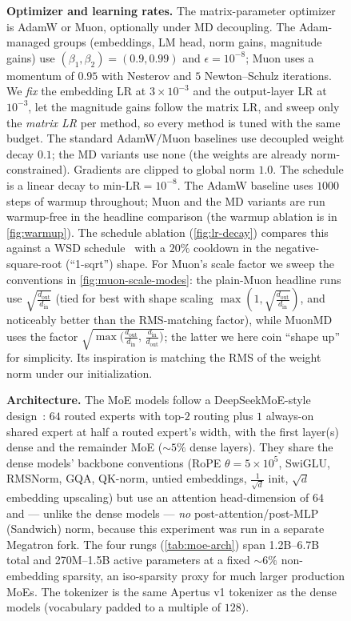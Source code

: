 \documentclass[10pt]{article} %
\makeatletter
\newcommand{\dout}{d_{\text{out}}}
\newcommand{\din}{d_{\text{in}}}
\def\subsection{\@startsection{subsection}{2}{\z@}{-1.6ex plus -0.5ex minus -.2ex}{0.5ex plus .1ex}{\normalsize\bf\raggedright\sffamily}}
\makeatother
\begin{document}
\begin{figure}[t]
\textbf{Optimizer and learning rates.} The matrix-parameter optimizer is AdamW or Muon, optionally under MD decoupling. The Adam-managed groups (embeddings, LM head, norm gains, magnitude gains) use $(\beta_1,\beta_2)=(0.9,0.99)$ and $\epsilon=10^{-8}$; Muon uses a momentum of $0.95$ with Nesterov and $5$ Newton--Schulz iterations. We \emph{fix} the embedding LR at $3\!\times\!10^{-3}$ and the output-layer LR at $10^{-3}$, let the magnitude gains follow the matrix LR, and sweep only the \emph{matrix LR} per method, so every method is tuned with the same budget. The standard AdamW/Muon baselines use decoupled weight decay $0.1$; the MD variants use none (the weights are already norm-constrained). Gradients are clipped to global norm $1.0$. The schedule is a linear decay to $\text{min-LR}=10^{-8}$. The AdamW baseline uses $1000$ steps of warmup throughout; Muon and the MD variants are run warmup-free in the headline comparison (the warmup ablation is in \autoref{fig:warmup}). The schedule ablation (\autoref{fig:lr-decay}) compares this against a WSD schedule~\citep{hu2024minicpm,hagele2024scaling,schaipp2025surprising,dremov2025training} with a $20\%$ cooldown in the negative-square-root (``1-sqrt'') shape. For Muon's scale factor we sweep the conventions in \autoref{fig:muon-scale-modes}: the plain-Muon headline runs use $\sqrt{\frac{\dout}{\din}}$ (tied for best with shape scaling $\max(1,\sqrt{\frac{\dout}{\din}})$, and noticeably better than the RMS-matching factor), while MuonMD uses the factor $\sqrt{\max\!\big(\frac{\dout}{\din},\, \frac{\din}{\dout}\big)}$; the latter we here coin ``shape up'' for simplicity. Its inspiration is matching the RMS of the weight norm under our initialization.

\subsection{Mixture-of-Experts Models}
\label{sec:appendix-setup-moe}

\textbf{Architecture.} The MoE models follow a DeepSeekMoE-style design~\citep{dai2024deepseekmoe}: $64$ routed experts with top-$2$ routing plus $1$ always-on shared expert at half a routed expert's width, with the first layer(s) dense and the remainder MoE ($\sim$$5\%$ dense layers). They share the dense models' backbone conventions (RoPE $\theta=5\!\times\!10^5$, SwiGLU, RMSNorm, GQA, QK-norm, untied embeddings, $\frac{1}{\sqrt{d}}$ init, $\sqrt{d}$ embedding upscaling) but use an attention head-dimension of $64$ and --- unlike the dense models --- \emph{no} post-attention/post-MLP (Sandwich) norm, because this experiment was run in a separate Megatron fork. The four rungs (\autoref{tab:moe-arch}) span 1.2B--6.7B total and 270M--1.5B active parameters at a fixed $\sim$$6\%$ non-embedding sparsity, an iso-sparsity proxy for much larger production MoEs. The tokenizer is the same Apertus v1 tokenizer as the dense models (vocabulary padded to a multiple of $128$).


\end{figure}
\end{document}
